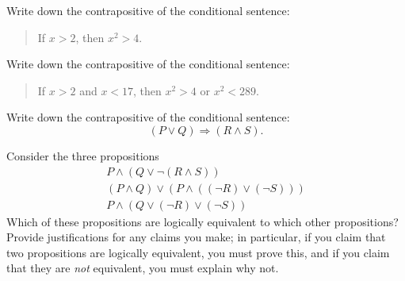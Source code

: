 \documentclass[12pt]{midterm}
\begin{document}
\begin{exam}
\begin{problem}[360]
  Write down the contrapositive of the conditional sentence:
  \begin{quote}
    If $x > 2$, then $x^2 > 4$.
  \end{quote}
\end{problem}

\begin{solution}\begin{solutiontext}
\end{solutiontext}\end{solution}


\begin{problem}[360]
  Write down the contrapositive of the conditional sentence:
  \begin{quote}
    If $x > 2$ and $x < 17$, then $x^2 > 4$ or $x^2 < 289$.
  \end{quote}
\end{problem}

\begin{solution}\begin{solutiontext}
\end{solutiontext}\end{solution}

\begin{problem}[360]
  Write down the contrapositive of the conditional sentence:
  $$
  (P \vee Q) \Rightarrow (R \wedge S).
  $$
\end{problem}

\begin{solution}\begin{solutiontext}
\end{solutiontext}\end{solution}

\begin{problem}[360]
  Consider the three propositions
  \begin{eqnarray}
    P \wedge (Q  \vee \neg (R \wedge S)) \label{prop1} \\
    (P \wedge Q) \vee (P \wedge ((\neg R) \vee (\neg S))) \label{prop2} \\
    P \wedge (Q  \vee (\neg R) \vee (\neg S)) \label{prop3} 
  \end{eqnarray}
  Which of these propositions are logically equivalent to which other
  propositions?  Provide justifications for any claims you make; in
  particular, if you claim that two propositions are logically
  equivalent, you must prove this, and if you claim that they are \textit{not} equivalent, you must explain why not.
\end{problem}


\end{exam}
\end{document}

